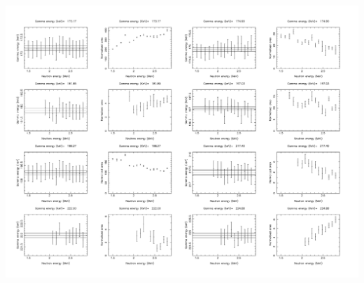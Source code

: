 \begin{center}
\includegraphics[page=35,angle=90,height=0.95\textheight]{160Gd_ExF_full.pdf}
\end{center}


